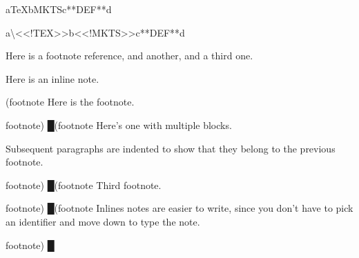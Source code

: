 
\mktsShowpar\par
a\TeX{}b{\mktsStyleBold{}MKTS}c**DEF**d\mktsShowpar\par
{\mktsStyleCode{}a\textbackslash{}<<!TEX>>b<<!MKTS>>c**DEF**d}\mktsShowpar\par
Here is a footnote reference, and another,
and a third one.\mktsShowpar\par
Here is an inline note.\mktsShowpar\par
{\mktsStyleBold\color{violet}{%
\mktsStyleSymbol█}(footnote {\mktsStyleSymbol}}Here is the footnote.\mktsShowpar\par
{\mktsStyleBold\color{violet}{%
\mktsStyleSymbol}footnote) {\mktsStyleSymbol█}}{\mktsStyleBold\color{violet}{%
\mktsStyleSymbol█}(footnote {\mktsStyleSymbol}}Here’s one with multiple blocks.\mktsShowpar\par
Subsequent paragraphs are indented to show that they
belong to the previous footnote.\mktsShowpar\par
{\mktsStyleBold\color{violet}{%
\mktsStyleSymbol}footnote) {\mktsStyleSymbol█}}{\mktsStyleBold\color{violet}{%
\mktsStyleSymbol█}(footnote {\mktsStyleSymbol}}Third footnote.\mktsShowpar\par
{\mktsStyleBold\color{violet}{%
\mktsStyleSymbol}footnote) {\mktsStyleSymbol█}}{\mktsStyleBold\color{violet}{%
\mktsStyleSymbol█}(footnote {\mktsStyleSymbol}}Inlines notes are easier to write, since
you don't have to pick an identifier and move down to type the
note.\mktsShowpar\par
{\mktsStyleBold\color{violet}{%
\mktsStyleSymbol}footnote) {\mktsStyleSymbol█}}
